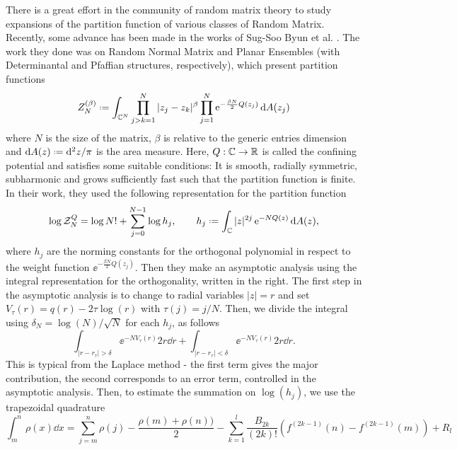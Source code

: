 \documentclass[12pt]{report}
\begin{document}
There is a great effort in the community of random matrix theory to study expansions of the partition function of various classes of Random Matrix. Recently, some advance has been made in the works of Sug-Soo Byun et al. \cite{Byun_2023}. The work they done was on Random Normal Matrix and Planar Ensembles (with Determinantal and Pfaffian structures, respectively), which present partition functions
\begin{equation}
	Z_N^{(\beta)} \deff \int_{\C^N}  \prod_{j>k=1}^{N} |z_j - z_k|^\beta \prod_{j=1}^{N} \ee^{-\frac{\beta N}{2} Q(z_j)} \dd A(z_j)
\end{equation}
where $N$ is the size of the matrix, $\beta$ is relative to the generic entries dimension and $\dd A(z) \deff \dd^2 z/\pi$ is the area measure. Here, $Q: \mathbb{C} \rightarrow \mathbb{R}$ is called the confining potential and satisfies some suitable conditions: It is smooth, radially symmetric, subharmonic and grows sufficiently fast such that the partition function is finite. In their work, they used the following representation for the partition function
\begin{equation}
	\log \pZ{N}{Q} = \log{N!} + \sum_{j=0}^{N-1} \log{h_j},  \qquad h_j \deff \int_{\C} |z|^{2j} \ee^{-N Q(z)} \dd A(z),
	\label{Equation: Partition Function}
\end{equation}
where $h_j$ are the norming constants for the orthogonal polynomial in respect to the weight function $\ee^{-\frac{\beta N}{2} Q(z_j)}$. Then they make an asymptotic analysis using the integral representation for the orthogonality, written in the right. The first step in the asymptotic analysis is to change to radial variables $|z| = r$ and set $V_\tau(r) = q(r) - 2\tau \log(r)$ with $\tau(j) = j/N$. Then, we divide the integral using $\delta_N = \log(N)/\sqrt{N}$ for each $h_j$, as follows
\begin{equation*}
	\int_{|r-r_\tau| > \delta} \ee^{-N V_\tau(r)} 2r \dd r + \int_{|r-r_\tau| < \delta} \ee^{-N V_\tau(r)} 2r \dd r.
\end{equation*}
This is typical from the Laplace method - the first term gives the major contribution, the second corresponds to an error term,  controlled in the asymptotic analysis. Then, to estimate the summation on $\log(h_j)$, we use the trapezoidal quadrature
\begin{equation*}
	\int_{m}^{n} \rho(x) \dd x = \sum_{j=m}^{n} \rho(j) - \frac{\rho(m)+ \rho(n))}{2} - \sum_{k=1}^{l} \frac{B_{2k}}{(2k)!} (f^{(2k-1)}(n) - f^{(2k-1)}(m)) + R_l
\end{equation*}
\end{document}
